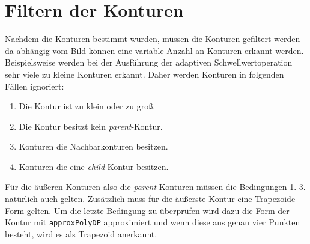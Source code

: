\section{Filtern der Konturen}
Nachdem die Konturen bestimmt wurden, müssen die Konturen gefiltert werden da abhängig vom Bild können eine variable Anzahl an Konturen
erkannt werden. Beispielsweise werden bei der Ausführung der adaptiven Schwellwertoperation sehr viele zu kleine Konturen erkannt. Daher werden Konturen in folgenden Fällen ignoriert:
\begin{enumerate}
	\item Die Kontur ist zu klein oder zu groß.
	\item Die Kontur besitzt kein \emph{parent}-Kontur.
	\item Konturen die Nachbarkonturen besitzen.
	\item Konturen die eine \emph{child}-Kontur besitzen.
\end{enumerate}
Für die äußeren Konturen also die \emph{parent}-Konturen müssen die Bedingungen 1.-3. natürlich auch gelten. Zusätzlich muss für die äußerste Kontur eine Trapezoide Form gelten. Um die letzte Bedingung zu überprüfen wird dazu die Form der Kontur mit \texttt{approxPolyDP} approximiert   und wenn diese aus genau vier Punkten besteht, wird es als Trapezoid anerkannt.

